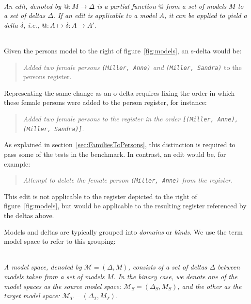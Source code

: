 \begin{definition}[Edit]
\label{def: edit}~\\
\emph{An edit, denoted by $@: M \rightarrow \Delta$ is a partial function $@$ from a set of models $M$ to a set of deltas $\Delta$.
If an edit is applicable to a model $A$, it can be applied to yield a delta $\delta$, i.e., 
$@: A \longmapsto \delta: A \rightarrow A'$}.
\end{definition}

\begin{example}~\\
Given the persons model to the right of figure~\ref{fig:models}, an s-delta would be:
\begin{quote}
\emph{Added two female persons \texttt{(Miller, Anne)} and \texttt{(Miller, Sandra)}} to the persons register.
\end{quote}
Representing the same change as an o-delta requires fixing the order in which these female persons were added to the person register, for instance:
\begin{quote}
\emph{Added two female persons to the register in the order \texttt{[(Miller, Anne), (Miller, Sandra)]}}.
\end{quote}
As explained in section~\ref{sec:FamiliesToPersons}, this distinction is required to pass some of the tests in the benchmark.
In contrast, an edit would be, for example:
\begin{quote}
\emph{Attempt to delete the female person \texttt{(Miller, Anne)} from the register}.    
\end{quote}
This edit is not applicable to the register depicted to the right of figure~\ref{fig:models}, but would be applicable to the resulting register referenced by the deltas above.  
\end{example}

Models and deltas are typically grouped into \emph{domains} or \emph{kinds}.
We use the term model space to refer to this grouping:
%
\begin{definition}
\label{def: model-space}~\\
\emph{A model space, denoted by $\mathcal{M} = (\Delta, M)$, consists of a set of deltas $\Delta$ between models taken from a set of models $M$. 
In the binary case, we denote one of the model spaces as the source model space: $\mathcal{M}_S = (\Delta_S, M_S)$, and the other as the target model space:  $\mathcal{M}_T = (\Delta_T, M_T)$.}
\end{definition}

